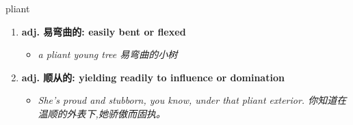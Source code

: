 
\begin{frame}
{\huge pliant}
\begin{center}
\begin{enumerate}\Large
  \item \textbf{adj. 易弯曲的: easily bent or flexed}
  \begin{itemize}
    \item \em{\Large{a pliant young tree 易弯曲的小树}}
  \end{itemize}
  \item \textbf{adj. 顺从的: yielding readily to influence or domination}
  \begin{itemize}
    \item \em{\Large{She’s proud and stubborn, you know, under that pliant exterior. 你知道在温顺的外表下,她骄傲而固执。}}
  \end{itemize}
\end{enumerate}
\end{center}
\end{frame}
